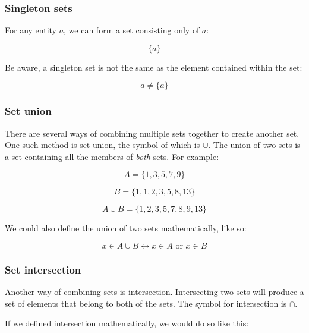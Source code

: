 \subsubsection{Singleton sets}

For any entity $a$, we can form a set consisting only of $a$:

\begin{dmath}
	\{a\}
\end{dmath}

Be aware, a singleton set is not the same as the element contained within the
set:

\begin{dmath}
	a \neq \{a\}
\end{dmath}

\subsubsection{Set union}

There are several ways of combining multiple sets together to create another
set. One such method is set union, the symbol of which is $\cup$. The union of
two sets is a set containing all the members of {\it both} sets. For example:

\begin{dmath}
	A = \{1, 3, 5, 7, 9\}
\end{dmath}

\begin{dmath}
 	B = \{1, 1, 2, 3, 5, 8, 13\}
\end{dmath}

\begin{dmath}
	A \cup B = \{1, 2, 3, 5, 7, 8, 9, 13\}
\end{dmath}

We could also define the union of two sets mathematically, like so:

\begin{dmath}
	x \in A \cup B \leftrightarrow x \in A \textrm{ or } x \in B
\end{dmath}

\subsubsection{Set intersection}

Another way of combining sets is intersection. Intersecting two sets will
produce a set of elements that belong to both of the sets. The symbol for
intersection is $\cap$.

If we defined intersection mathematically, we would do so like this:

